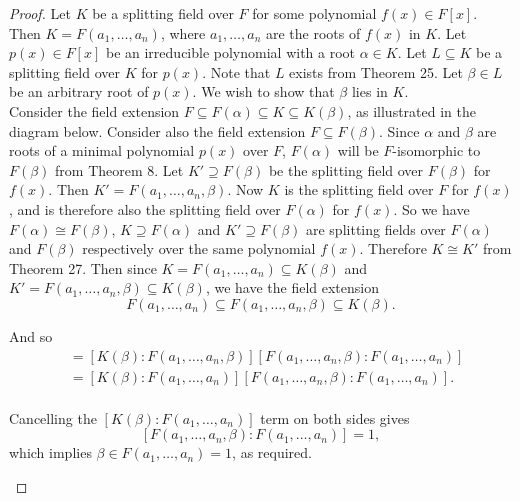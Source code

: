 \documentclass{article}
\begin{document}
  \begin{proof}
    Let $K$ be a splitting field over $F$ for some polynomial $f(x)\in
    F[x]$. Then $K=F(a_1,\ldots,a_n)$, where $a_1,\ldots,a_n$ are the roots
    of $f(x)$ in $K$. Let $p(x)\in F[x]$ be an irreducible polynomial with
    a root $\alpha\in K$. Let $L\subseteq K$ be a splitting field over $K$
    for $p(x)$. Note that $L$ exists from Theorem 25. Let $\beta\in L$ be
    an arbitrary root of $p(x)$. We wish to show that $\beta$ lies in
    $K$. \\

    Consider the field extension $F\subseteq F(\alpha) \subseteq K
    \subseteq K(\beta)$, as illustrated in the diagram below. Consider also
    the field extension $F\subseteq F(\beta)$. Since $\alpha$ and $\beta$
    are roots of a minimal polynomial $p(x)$ over $F$, $F(\alpha)$ will be
    $F$-isomorphic to $F(\beta)$ from Theorem 8. Let $K'\supseteq F(\beta)$
    be the splitting field over $F(\beta)$ for $f(x)$. Then
    $K'=F(a_1,\ldots,a_n,\beta)$. Now $K$ is the splitting field over $F$
    for $f(x)$, and is therefore also the splitting field over $F(\alpha)$
    for $f(x)$. So we have $F(\alpha)\cong F(\beta)$, $K\supseteq
    F(\alpha)$ and $K'\supseteq F(\beta)$ are splitting fields over
    $F(\alpha)$ and $F(\beta)$ respectively over the same polynomial
    $f(x)$. Therefore $K\cong K'$ from Theorem 27. Then since $K=
    F(a_1,\ldots,a_n)\subseteq K(\beta)$ and $K'=
    F(a_1,\ldots,a_n,\beta)\subseteq K(\beta)$, we have the field extension
    \[F(a_1,\ldots,a_n) \subseteq F(a_1,\ldots,a_n,\beta) \subseteq
    K(\beta).\]

    And so
    \begin{align*}
      [K(\beta):F(a_1,\ldots,a_n)] &=[K(\beta):F(a_1,\ldots,a_n,\beta)]
        [F(a_1,\ldots,a_n,\beta):F(a_1,\ldots,a_n)]\\
      &=[K(\beta):F(a_1,\ldots,a_n)]
        [F(a_1,\ldots,a_n,\beta):F(a_1,\ldots,a_n)].\\
    \end{align*}

    Cancelling the $[K(\beta):F(a_1,\ldots,a_n)]$ term on both sides gives
    \[[F(a_1,\ldots,a_n,\beta):F(a_1,\ldots,a_n)]=1,\]
    which implies $\beta\in F(a_1,\ldots,a_n)=1$, as required.

    \begin{center}
    \end{center}


\end{proof}
\end{document}
